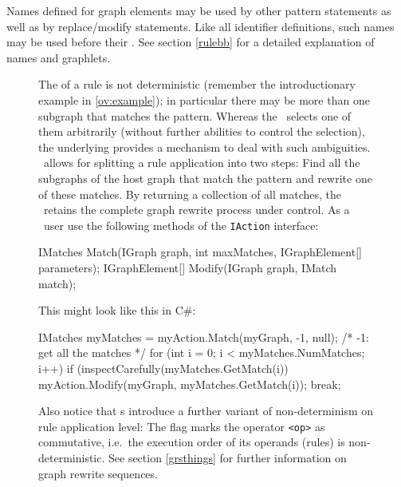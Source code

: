 Names defined for graph elements may be used by other pattern statements as well as by replace/modify statements. 
Like all identifier definitions, such names may be used before their . 
See section \ref{rulebb} for a detailed explanation of names and graphlets.
\begin{figure}[htbp]
\begin{note}
\label{note:indeterminism}
The  of a rule is not deterministic (remember the introductionary example in \ref{ov:example}); in particular there may be more than one subgraph that matches the pattern. 
Whereas the \GrShell\ selects one of them arbitrarily (without further abilities to control the selection), the underlying \LibGr{} provides a mechanism to deal with such ambiguities. 
\LibGr\ allows for splitting a rule application into two steps: Find all the subgraphs of the host graph that match the pattern and rewrite one of these matches. 
By returning a collection of all matches, the \LibGr\ retains the complete graph rewrite process under control.
As a \LibGr\ user use the following methods of the \texttt{IAction} interface:
\begin{csharplet}
IMatches Match(IGraph graph, int maxMatches, IGraphElement[] parameters);
IGraphElement[] Modify(IGraph graph, IMatch match);
\end{csharplet}
This might look like this in C\#:
\begin{csharplet}
IMatches myMatches = myAction.Match(myGraph, -1, null); /* -1: get all the matches */
for (int i = 0;  i < myMatches.NumMatches; i++)
{
	if (inspectCarefully(myMatches.GetMatch(i))
	{
		myAction.Modify(myGraph, myMatches.GetMatch(i));
		break;
  	}
}
\end{csharplet}

Also notice that s introduce a further variant of non-determinism on rule application level: 
The  flag marks the operator \texttt{<op>} as commutative, i.e.\ the execution order of its operands (rules) is non-deterministic. 
See section \ref{grsthings} for further information on graph rewrite sequences.
\end{note}
\end{figure}

